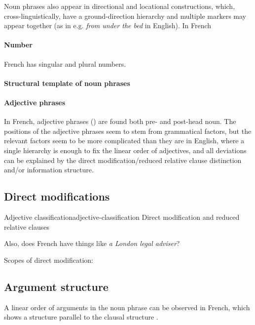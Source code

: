 \documentclass[a4paper, oneside, 12pt]{report}
\newcommand*{\citesec}[1]{\S~{#1}}
\newcommand*{\citepage}[1]{p.~{#1}}
\newcommand{\form}[1]{\emph{#1}}
\begin{document}
Noun phrases also appear in directional and locational constructions,
which, cross-linguistically, have a ground-direction hierarchy and multiple markers may appear together
(as in e.g. \form{from under the bed} in English).
In French 

\paragraph*{Number} French has singular and plural numbers.

\paragraph*{Structural template of noun phrases}

\paragraph*{Adjective phrases}
In French, adjective phrases () are found both pre- and post-head noun.
The positions of the adjective phrases seem to stem from grammatical factors,
but the relevant factors seem to be more complicated than they are in English,
where a single hierarchy is enough to fix the linear order of adjectives,
and all deviations can be explained by the direct modification/reduced relative clause distinction
and/or information structure.

\subsection{Direct modifications}\label{sec:grammatical.np.direct-modify}

\begin{todobox}{Adjective classification}{adjective-classification}
    Direct modification and reduced relative clauses

    Also, does French have things like \form{a London legal adviser}?
    
    Scopes of direct modification: \citep[\citesec{3.7.1}]{rowlett2007syntax}
\end{todobox}


\subsection{Argument structure}

A linear order of arguments in the noun phrase can be observed in French,
which shows a structure parallel to the clausal structure \citep[\citepage{21}]{rowlett2007syntax}.
\end{document}
